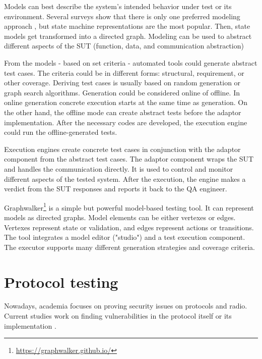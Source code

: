 Models can best describe the system's intended behavior under test or its environment. Several surveys show that there is only one preferred modeling approach \cite{10.1145/1353673.1353681, mbt-survey:2016, mbt-survey:2019}, but state machine representations are the most popular. Then, state models get transformed into a directed graph. Modeling can be used to abstract different aspects of the SUT (function, data, and communication abstraction)

From the models - based on set criteria - automated tools could generate abstract test cases. The criteria could be in different forms: structural, requirement, or other coverage. Deriving test cases is usually based on random generation or graph search algorithms. Generation could be considered online of offline. In online generation concrete execution starts at the same time as generation. On the other hand, the offline mode can create abstract tests before the adaptor implementation. After the necessary codes are developed, the execution engine could run the offline-generated tests.

Execution engines create concrete test cases in conjunction with the adaptor component from the abstract test cases. The adaptor component wraps the SUT and handles the communication directly. It is used to control and monitor different aspects of the tested system. After the execution, the engine makes a verdict from the SUT responses and reports it back to the QA engineer.

Graphwalker\footnote{\url{https://graphwalker.github.io/}} is a simple but powerful model-based testing tool. It can represent models as directed graphs. Model elements can be either vertexes or edges. Vertexes represent state or validation, and edges represent actions or transitions. The tool integrates a model editor ("studio") and a test execution component. The executor supports many different generation strategies and coverage criteria.

\section{Protocol testing}
Nowadays, academia focuses on proving security issues on protocols and radio. Current studies work on finding vulnerabilities in the protocol itself or its implementation \cite{10.1145/3576915.3623066, 10.1145/3448300.3468287, 10.1145/3448300.3468296, 10.1145/3548606.3560703, 10.1145/3098243.3098254, 10.1145/3597926.3598144, 10.1145/3507657.3528544}.

